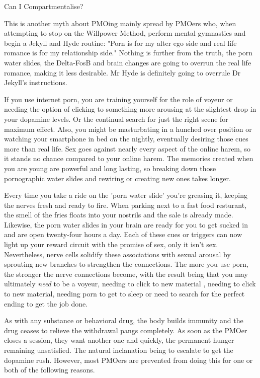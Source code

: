 Can I Compartmentalise?

This is another myth about PMOing mainly spread by PMOers who, when attempting to stop on the Willpower Method, perform mental gymnastics and begin a Jekyll and Hyde routine: "Porn is for my alter ego side and real life romance is for my relationship side." Nothing is further from the truth, the porn water slides, the Delta-FosB and brain changes are going to overrun the real life romance, making it less desirable. Mr Hyde is definitely going to overrule Dr Jekyll's instructions.

If you use internet porn, you are training yourself for the role of voyeur or needing the option of clicking to something more arousing at the slightest drop in your dopamine levels. Or the continual search for just the right scene for maximum effect. Also, you might be masturbating in a hunched over position or watching your smartphone in bed on the nightly, eventually desiring those cues more than real life. Sex goes against nearly every aspect of the online harem, so it stands no chance compared to your online harem. The memories created when you are young are powerful and long lasting, so breaking down those pornographic water slides and rewiring or creating new ones takes longer.

Every time you take a ride on the 'porn water slide' you're greasing it, keeping the nerves fresh and ready to fire. When parking next to a fast food resturant, the smell of the fries floats into your nostrils and the sale is already made. Likewise, the porn water slides in your brain are ready for you to get sucked in and are open twenty-four hours a day. Each of these cues or triggers can now light up your reward circuit with the promise of sex, only it isn't sex. Nevertheless, nerve cells solidify these associations with sexual arousal by sprouting new branches to strengthen the connections. The more you use porn, the stronger the nerve connections become, with the result being that you may ultimately \textit{need} to be a voyeur, needing to click to new material , needing to click to new material, needing porn to get to sleep or need to search for the perfect ending to get the job done.

As with any substance or behavioral drug, the body builds immunity and the drug ceases to relieve the withdrawal pangs completely. As soon as the PMOer closes a session, they want another one and quickly, the permanent hunger remaining unsatisfied. The natural inclanation being to escalate to get the dopamine rush. However, most PMOers are prevented from doing this for one or both of the following reasons.

